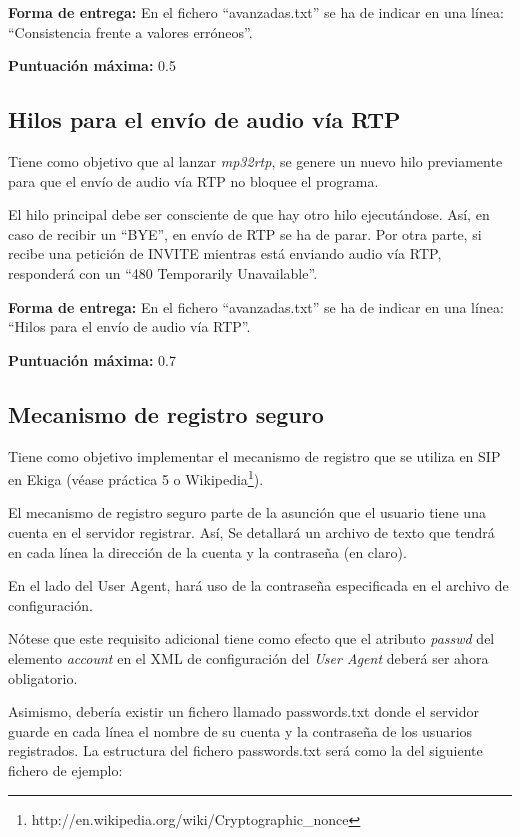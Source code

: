 \documentclass[a4paper,11pt]{article}
\begin{document}
  {\bf Forma de entrega:} En el fichero ``avanzadas.txt'' se ha de indicar en una línea: ``Consistencia frente a valores erróneos''.

  {\bf Puntuación máxima:} 0.5



\subsection*{Hilos para el envío de audio vía RTP}

Tiene como objetivo que al lanzar \emph{mp32rtp}, se genere un nuevo hilo previamente para que el envío de audio vía RTP no bloquee el programa.

El hilo principal debe ser consciente de que hay otro hilo ejecutándose. Así, en caso de recibir un ``BYE'', en envío de RTP se ha de parar. Por otra parte, si recibe una petición de INVITE mientras está enviando audio vía RTP, responderá con un ``480 Temporarily Unavailable''.

  {\bf Forma de entrega:} En el fichero ``avanzadas.txt'' se ha de indicar en una línea: ``Hilos para el envío de audio vía RTP''.

  {\bf Puntuación máxima:} 0.7


\subsection*{Mecanismo de registro seguro}

Tiene como objetivo implementar el mecanismo de registro que se utiliza en SIP en Ekiga (véase práctica 5 o Wikipedia\footnote{http://en.wikipedia.org/wiki/Cryptographic\_nonce}).

El mecanismo de registro seguro parte de la asunción que el usuario tiene una cuenta en el servidor registrar. Así, Se detallará un archivo de texto que tendrá en cada línea la dirección de la cuenta y la contraseña (en claro). 

En el lado del User Agent, hará uso de la contraseña especificada en el archivo de configuración.

Nótese que este requisito adicional tiene como efecto que el atributo \emph{passwd} del elemento \emph{account} en el XML de configuración del \emph{User Agent} deberá ser ahora obligatorio.

Asimismo, debería existir un fichero llamado passwords.txt donde el servidor guarde en cada línea el nombre de su cuenta y la contraseña de los usuarios registrados. La estructura del fichero passwords.txt será como la del siguiente fichero de ejemplo:
\end{document}
